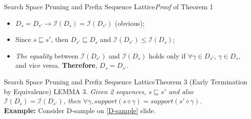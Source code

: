 \documentclass[12pt]{beamer}
\begin{document}
\begin{frame}{Search Space Pruning and Prefix Sequence Lattice}{{\it Proof} of Theorem 1}
\begin{itemize}
\item $D_s = D_{s'} \rightarrow \mathcal{I}(D_s) = \mathcal{I}(D_{s'})$ (obvious);
\item Since $s \sqsubseteq s'$, then $D_{s'} \sqsubseteq D_s$ and $\mathcal{I}(D_{s'}) \leq \mathcal{I}(D_s)$;
\item {\it The equality} between  $\mathcal{I}(D_{s'})$ and $\mathcal{I}(D_s)$ holds only if $\forall\gamma \in D_{s'}$, $\gamma \in D_s$, and vice versa. {\bf Therefore}, $D_s = D_{s'}$.
\end{itemize}
\end{frame}

\begin{frame}{Search Space Pruning and Prefix Sequence Lattice}{Theorem 3 (Early Termination by Equivalence)}
LEMMA 3. {\it Given 2 sequences, $s \sqsubseteq s'$ and also $\mathcal{I}(D_s) = \mathcal{I}(D_{s'})$, then $\forall\gamma, support(s \diamond \gamma) = support(s' \diamond \gamma)$.}\\
{\bf Example:} Consider D-sample on \ref{D-sample} slide.

\end{frame}
\end{document}
